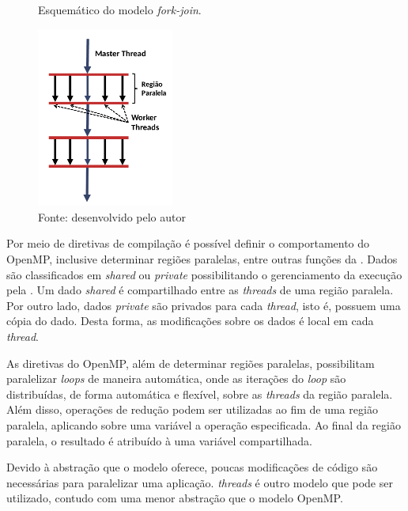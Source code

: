 \begin{figure}
	\centering
	\caption{Esquemático do modelo \textit{fork-join}.}
	\includegraphics[width=0.4\textwidth]{figs/forkjoin.pdf}
    \caption*{Fonte: desenvolvido pelo autor}
	\label{fig:forkjoin}
\end{figure}

Por meio de diretivas de compilação é possível definir o comportamento do
OpenMP, inclusive determinar regiões paralelas, entre outras funções da \api.
Dados são classificados em \textit{shared} ou \textit{private} possibilitando
o gerenciamento da execução pela \api. Um dado \textit{shared} é compartilhado
entre as \textit{threads} de uma região paralela. Por outro lado, dados
\textit{private} são privados para cada \textit{thread}, isto é, possuem uma
cópia do dado. Desta forma, as modificações sobre os dados é local em cada
\textit{thread}.

As diretivas do OpenMP, além de determinar regiões paralelas, possibilitam
paralelizar \textit{loops} de maneira automática, onde as iterações
do \textit{loop} são distribuídas, de forma automática e flexível, sobre as
\textit{threads} da região paralela. Além disso, operações de redução podem ser
utilizadas ao fim de uma região paralela, aplicando sobre uma variável a
operação especificada. Ao final da região paralela, o resultado é atribuído à
uma variável compartilhada.

Devido à abstração que o modelo oferece, poucas modificações de código são
necessárias para paralelizar uma aplicação. \posix \textit{threads} é outro
modelo que pode ser utilizado, contudo com uma menor abstração que o modelo
OpenMP.

